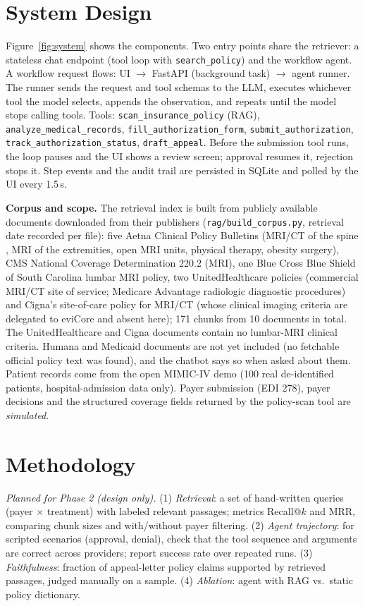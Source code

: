 \documentclass[final]{cvpr}
\begin{document}
\section{System Design}
Figure~\ref{fig:system} shows the components. Two entry points share the retriever: a stateless chat endpoint (tool loop with \texttt{search\_policy}) and the workflow agent. A workflow request flows: UI $\to$ FastAPI (background task) $\to$ agent runner. The runner sends the request and tool schemas to the LLM, executes whichever tool the model selects, appends the observation, and repeats until the model stops calling tools. Tools: \texttt{scan\_insurance\_policy} (RAG), \texttt{analyze\_medical\_records}, \texttt{fill\_authorization\_form}, \texttt{submit\_authorization}, \texttt{track\_authorization\_status}, \texttt{draft\_appeal}. Before the submission tool runs, the loop pauses and the UI shows a review screen; approval resumes it, rejection stops it. Step events and the audit trail are persisted in SQLite and polled by the UI every 1.5\,s.

\textbf{Corpus and scope.} The retrieval index is built from publicly available documents downloaded from their publishers (\texttt{rag/build\_corpus.py}, retrieval date recorded per file): five Aetna Clinical Policy Bulletins (MRI/CT of the spine \cite{aetna0236}, MRI of the extremities, open MRI units, physical therapy, obesity surgery), CMS National Coverage Determination 220.2 (MRI), one Blue Cross Blue Shield of South Carolina lumbar MRI policy, two UnitedHealthcare policies (commercial MRI/CT site of service; Medicare Advantage radiologic diagnostic procedures) and Cigna's site-of-care policy for MRI/CT (whose clinical imaging criteria are delegated to eviCore and absent here); 171 chunks from 10 documents in total. The UnitedHealthcare and Cigna documents contain no lumbar-MRI clinical criteria. Humana and Medicaid documents are not yet included (no fetchable official policy text was found), and the chatbot says so when asked about them. Patient records come from the open MIMIC-IV demo \cite{mimicdemo} (100 real de-identified patients, hospital-admission data only). Payer submission (EDI 278), payer decisions and the structured coverage fields returned by the policy-scan tool are \emph{simulated}.

\section{Methodology}
\label{sec:method}
\textit{Planned for Phase 2 (design only).} (1) \emph{Retrieval}: a set of hand-written queries (payer $\times$ treatment) with labeled relevant passages; metrics Recall@$k$ and MRR, comparing chunk sizes and with/without payer filtering. (2) \emph{Agent trajectory}: for scripted scenarios (approval, denial), check that the tool sequence and arguments are correct across providers; report success rate over repeated runs. (3) \emph{Faithfulness}: fraction of appeal-letter policy claims supported by retrieved passages, judged manually on a sample. (4) \emph{Ablation}: agent with RAG vs.\ static policy dictionary.
\end{document}
